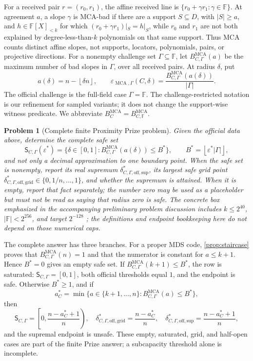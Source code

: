 \documentclass[a4paper,11pt]{amsart}
\newtheorem{problem}[theorem]{Problem}
\theoremstyle{remark}
\DeclareMathOperator{\MCA}{MCA}
\newcommand{\F}{\mathbb F}
\newcommand{\Gam}{\Gamma}
\newcommand{\abs}[1]{\lvert#1\rvert}
\newcommand{\floor}[1]{\left\lfloor#1\right\rfloor}
\begin{document}
For a received pair \(r=(r_0,r_1)\), the affine received line is
\(\{r_0+\gamma r_1:\gamma\in\F\}\).  At agreement \(a\), a slope
\(\gamma\) is MCA-bad if there are a support \(S\subseteq D\), with
\(\abs S\ge a\), and \(h\in\F[X]_{<k}\) for which
\((r_0+\gamma r_1)|_S=h|_S\), while \(r_0\) and \(r_1\) are not both
explained by degree-less-than-\(k\) polynomials on that same support.  Thus
MCA counts distinct affine slopes, not supports, locators, polynomials,
pairs, or projective directions.  For a nonempty challenge set
\(\Gam\subseteq\F\), let \(B_{C,\Gam}^{\MCA}(a)\) be the maximum number of
bad slopes in \(\Gam\), over all received pairs.  At radius \(\delta\), put
\[
 a(\delta)=n-\floor{\delta n},\qquad
 \varepsilon_{\MCA,\Gam}(C,\delta)
 =\frac{B_{C,\Gam}^{\MCA}(a(\delta))}{\abs\Gam}.     \tag{1.1}\label{eq:intro-error}
\]
The official challenge is the full-field case \(\Gam=\F\).  The
challenge-restricted notation is our refinement for sampled variants; it
does not change the support-wise witness predicate.  We abbreviate
\(B_C^{\MCA}=B_{C,\F}^{\MCA}\).

\begin{problem}[Complete finite Proximity Prize problem]\label{prob:finite-prize}
Given the official data above, determine the complete safe set
\[
 \mathsf S_{C,\Gam}(\varepsilon^*)
 =\{\delta\in[0,1]:
       B_{C,\Gam}^{\MCA}(a(\delta))
       \le B^*\},\qquad
 B^*=\floor{\varepsilon^*\abs\Gam},                \tag{1.2}\label{eq:intro-safe-set}
\]
and not only a decimal approximation to one boundary point.  When the safe
set is nonempty, report its real supremum
\(\delta_{C,\Gam,\mathrm{off,sup}}^*\), its largest safe grid point
\(\delta_{C,\Gam,\mathrm{off,grid}}^*\in\{0,1/n,\ldots,1\}\), and whether
the supremum is attained.  When it is empty, report that fact separately;
the number zero may be used as a placeholder but must not be read as saying
that radius zero is safe.
The concrete box emphasized in the accompanying preliminary problem
discussion includes \(k\le2^{40}\), \(\abs\F<2^{256}\), and target
\(2^{-128}\) \cite{ABF26}; the definitions and endpoint bookkeeping here do
not depend on those numerical caps.
\end{problem}

The complete answer has three branches.  For a proper MDS code,
\cref{prop:staircase} proves that \(B_{C,\Gam}^{\MCA}(n)=1\) and that the
numerator is constant for \(a\le k+1\).  Hence \(B^*=0\) gives an empty safe
set.  If \(B_{C,\Gam}^{\MCA}(k+1)\le B^*\), the row is saturated:
\(\mathsf S_{C,\Gam}=[0,1]\), both official thresholds equal \(1\), and the
endpoint is safe.  Otherwise \(B^*\ge1\), and if
\[
 a_C^*=\min\{a\in\{k+1,\ldots,n\}:
                   B_{C,\Gam}^{\MCA}(a)\le B^*\},   \tag{1.3}\label{eq:intro-first-safe}
\]
then
\[
 \mathsf S_{C,\Gam}
 =\left[0,\frac{n-a_C^*+1}{n}\right),\quad
 \delta_{C,\Gam,\mathrm{off,grid}}^*=\frac{n-a_C^*}{n},\quad
 \delta_{C,\Gam,\mathrm{off,sup}}^*=\frac{n-a_C^*+1}{n}, \tag{1.4}\label{eq:intro-staircase}
\]
and the supremal endpoint is unsafe.  These empty, saturated, grid, and
half-open cases are part of the finite Prize answer; a subcapacity threshold
alone is incomplete.
\end{document}
